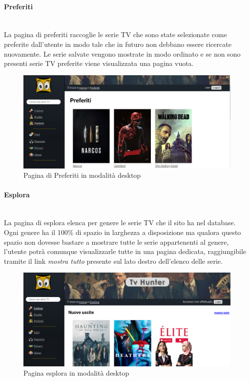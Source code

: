 \paragraph{Preferiti}
~\\	
La pagina di preferiti raccoglie le serie TV che sono state selezionate come preferite dall'utente in modo tale che in futuro non debbano essere ricercate nuovamente. Le serie salvate vengono mostrate in modo ordinato e se non sono presenti serie TV preferite viene visualizzata una pagina vuota. 
\begin{figure}[H]
	\centerline{\includegraphics[scale=0.33]{img/preferiti.png}}
	\caption{Pagina di Preferiti in modalità desktop}
	\label{fig:addForm}
\end{figure}	


\paragraph{Esplora}
~\\	
La pagina di esplora elenca per genere le serie TV che il sito ha nel database. Ogni genere ha il 100\% di spazio in larghezza a disposizione ma qualora questo spazio non dovesse bastare a mostrare tutte le serie appartenenti al genere, l'utente potrà comunque visualizzarle tutte in una pagina dedicata, raggiungibile tramite il link \textit{mostra tutto} presente sul lato destro dell'elenco delle serie.
\begin{figure}[H]
	\centerline{\includegraphics[scale=0.33]{img/esplora.png}}
	\caption{Pagina esplora in modalità desktop}
	\label{fig:addForm}
\end{figure}	

